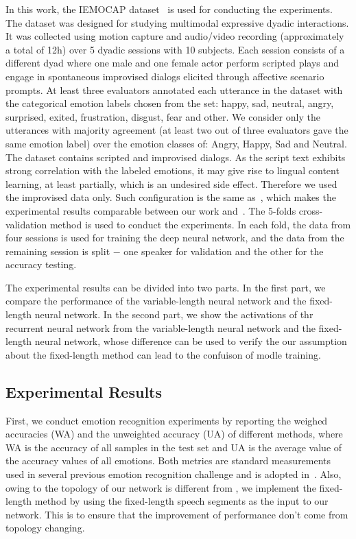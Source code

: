 \documentclass[a4paper]{article}
\begin{document}
In this work, the IEMOCAP dataset~\cite{busso2008} is used for conducting the experiments. The dataset was designed for studying multimodal expressive dyadic interactions. It was collected using motion capture and audio/video recording (approximately a total of 12h) over 5 dyadic sessions with 10 subjects. Each session consists of a different dyad where one male and one female actor perform scripted plays and engage in spontaneous improvised dialogs elicited through affective scenario prompts. At least three evaluators annotated each utterance in the dataset with the categorical emotion labels chosen from the set: happy, sad, neutral, angry, surprised, exited, frustration, disgust, fear and other. We consider only the utterances with majority agreement (at least two out of three evaluators gave the same emotion label) over the emotion classes of: Angry, Happy, Sad and Neutral. The dataset contains scripted and improvised dialogs. As the script text exhibits strong correlation with the labeled emotions, it may give rise to lingual content learning, at least partially, which is an undesired side effect. Therefore we used the improvised data only. Such configuration is the same as~\cite{satt2017}, which makes the experimental results comparable between our work and~\cite{satt2017}. The 5-folds cross-validation method is used to conduct the experiments. In each fold, the data from four sessions is used for training the deep neural network, and the data from the remaining session is split $-$ one speaker for validation and the other for the accuracy testing.

The experimental results can be divided into two parts. In the first part, we compare the performance of the variable-length neural network and the fixed-length neural network. In the second part, we show the activations of thr recurrent neural network from the variable-length neural network and the fixed-length neural network, whose difference can be used to verify the our assumption about the fixed-length method can lead to the confuison of modle training. 

\subsection{Experimental Results}
\label{ssec:experimental_results}
First, we conduct emotion recognition experiments by reporting the weighed accuracies (WA) and the unweighted accuracy (UA) of different methods, where WA is the accuracy of all samples in the test set and UA is the average value of the accuracy values of all emotions. Both metrics are standard measurements used in several previous emotion recognition challenge and is adopted in~\cite{satt2017}. Also, owing to the topology of our network is different from \cite{satt2017}, we implement the fixed-length method by using the fixed-length speech segments as the input to our network. This is to ensure that the improvement of performance don't come from topology changing.
\end{document}
